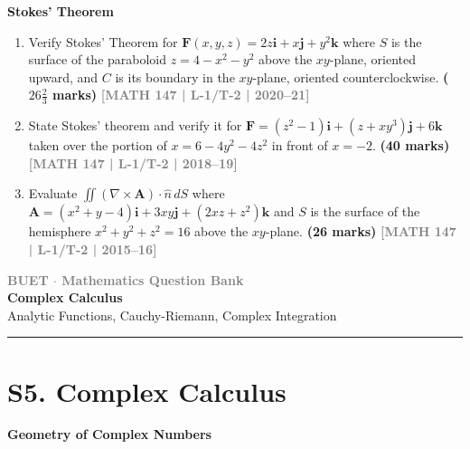 \documentclass[12pt,a4paper]{article}
\newcommand{\yr}[1]{\hfill\textcolor{gray}{\small\textbf{[#1]}}}
\newcommand{\mk}[1]{\textcolor{orange!70!black}{\small\textbf{(#1 marks)}}}
\newcommand{\subtopic}[2]{%
  \vspace{10pt}
  \noindent\begin{tcolorbox}[colback=#1!8,colframe=#1,boxrule=0.6pt,arc=4pt,
    left=6pt,right=6pt,top=4pt,bottom=4pt]
    \small\bfseries\textcolor{#1}{#2}
  \end{tcolorbox}
  \vspace{2pt}
}
\newcommand{\secdivider}[3]{%
  \newpage\thispagestyle{empty}%
  \vspace*{\fill}%
  \begin{tcolorbox}[enhanced,colback=#3!6,colframe=#3,boxrule=1.5pt,arc=8pt,
    left=20pt,right=20pt,top=22pt,bottom=22pt,
    shadow={3pt}{-3pt}{0pt}{black!15}]
    \centering
    {\large\textcolor{gray}{\textbf{BUET $\cdot$ Mathematics Question Bank}}}\\[8pt]
    {\fontsize{26}{32}\selectfont\bfseries\textcolor{#3}{#1}}\\[6pt]
    {\fontsize{15}{19}\selectfont\textcolor{dgray}{#2}}\\[12pt]
    \textcolor{#3!60}{\rule{0.5\textwidth}{0.5pt}}
  \end{tcolorbox}%
  \vspace*{\fill}\newpage%
}
\begin{document}
\subtopic{cD}{Stokes' Theorem}
\label{sub:s4-stokes}

\begin{enumerate}\item Verify Stokes' Theorem for $\mathbf{F}(x,y,z)=2z\mathbf{i}+x\mathbf{j}+y^{2}\mathbf{k}$ where $S$ is the surface of the paraboloid $z=4-x^{2}-y^{2}$ above the $xy$-plane, oriented upward, and $C$ is its boundary in the $xy$-plane, oriented counterclockwise.
\mk{$26\tfrac{2}{3}$} \yr{MATH 147 | L-1/T-2 | 2020--21}

\item State Stokes' theorem and verify it for $\mathbf{F}=(z^{2}-1)\mathbf{i}+(z+xy^{3})\mathbf{j}+6\mathbf{k}$ taken over the portion of $x=6-4y^{2}-4z^{2}$ in front of $x=-2$.
\mk{40} \yr{MATH 147 | L-1/T-2 | 2018--19}

\item Evaluate $\displaystyle\iint(\nabla\times\mathbf{A})\cdot\hat{n}\,dS$ where $\mathbf{A}=(x^{2}+y-4)\mathbf{i}+3xy\mathbf{j}+(2xz+z^{2})\mathbf{k}$ and $S$ is the surface of the hemisphere $x^{2}+y^{2}+z^{2}=16$ above the $xy$-plane.
\mk{26} \yr{MATH 147 | L-1/T-2 | 2015--16}

\end{enumerate}


\secdivider{Complex Calculus}{Analytic Functions, Cauchy-Riemann, Complex Integration}{cE}

\section{S5. Complex Calculus}
\label{sec:S5}

\subtopic{cE}{Geometry of Complex Numbers}
\label{sub:s5-geometry}
\end{document}

